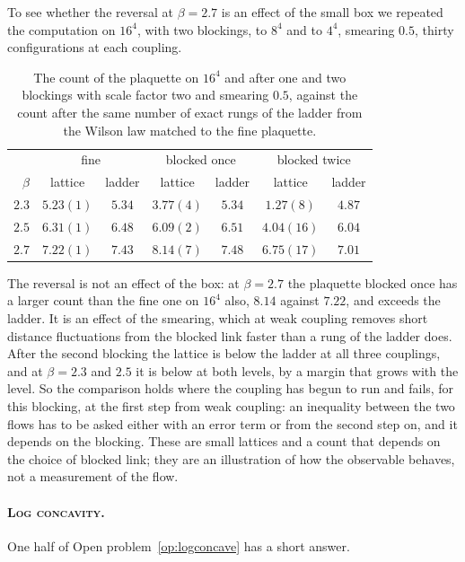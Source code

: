To see whether the reversal at $\beta=2.7$ is an effect of the small box we repeated the computation on $16^4$, with two blockings, to $8^4$ and to $4^4$, smearing $0.5$, thirty configurations at each coupling.

\begin{table}[t]
\centering\small
\begin{tabular}{rcccccc}
\toprule
 & \multicolumn{2}{c}{fine} & \multicolumn{2}{c}{blocked once} & \multicolumn{2}{c}{blocked twice} \\
$\beta$ & lattice & ladder & lattice & ladder & lattice & ladder \\ \midrule
$2.3$ & $5.23(1)$ & $5.34$ & $3.77(4)$ & $5.34$ & $1.27(8)$ & $4.87$ \\
$2.5$ & $6.31(1)$ & $6.48$ & $6.09(2)$ & $6.51$ & $4.04(16)$ & $6.04$ \\
$2.7$ & $7.22(1)$ & $7.43$ & $8.14(7)$ & $7.48$ & $6.75(17)$ & $7.01$ \\
\bottomrule
\end{tabular}
\caption[Two blockings on $16^4$]{The count of the plaquette on $16^4$ and after one and two blockings with scale factor two and smearing $0.5$, against the count after the same number of exact rungs of the ladder from the Wilson law matched to the fine plaquette.}
\label{tab:countblocked2}
\end{table}

The reversal is not an effect of the box: at $\beta=2.7$ the plaquette blocked once has a larger count than the fine one on $16^4$ also, $8.14$ against $7.22$, and exceeds the ladder. It is an effect of the smearing, which at weak coupling removes short distance fluctuations from the blocked link faster than a rung of the ladder does. After the second blocking the lattice is below the ladder at all three couplings, and at $\beta=2.3$ and $2.5$ it is below at both levels, by a margin that grows with the level. So the comparison holds where the coupling has begun to run and fails, for this blocking, at the first step from weak coupling: an inequality between the two flows has to be asked either with an error term or from the second step on, and it depends on the blocking. These are small lattices and a count that depends on the choice of blocked link; they are an illustration of how the observable behaves, not a measurement of the flow.

\paragraph{\normalfont\scshape Log concavity.} One half of Open problem~\ref{op:logconcave} has a short answer.

